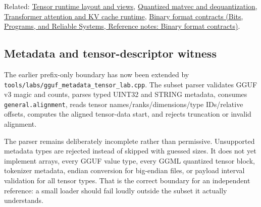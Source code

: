 Related: \hyperref[appendix-cebadf3106d1]{Tensor runtime layout and views}, \hyperref[appendix-241c0e42ac2d]{Quantized matvec and dequantization}, \hyperref[appendix-ea2dadd21ce5]{Transformer attention and KV cache runtime}, \href{../01-Bits-Programs-and-Reliable-Systems/main.pdf\#nameddest=appendix-590bbb2424c1}{Binary format contracts (Bits, Programs, and Reliable Systems, Reference notes: Binary format contracts)}.

\subsection{Metadata and tensor-descriptor witness}\label{appendix-fef72dd246f2-metadata-and-tensor-descriptor-witness}

The earlier prefix-only boundary has now been extended by \texttt{tools/labs/gguf\_metadata\_tensor\_lab.cpp}. The subset parser validates GGUF v3 magic and counts, parses typed UINT32 and STRING metadata, consumes \texttt{general.alignment}, reads tensor names/ranks/dimensions/type IDs/relative offsets, computes the aligned tensor-data start, and rejects truncation or invalid alignment.

The parser remains deliberately incomplete rather than permissive. Unsupported metadata types are rejected instead of skipped with guessed sizes. It does not yet implement arrays, every GGUF value type, every GGML quantized tensor block, tokenizer metadata, endian conversion for big-endian files, or payload interval validation for all tensor types. That is the correct boundary for an independent reference: a small loader should fail loudly outside the subset it actually understands.
